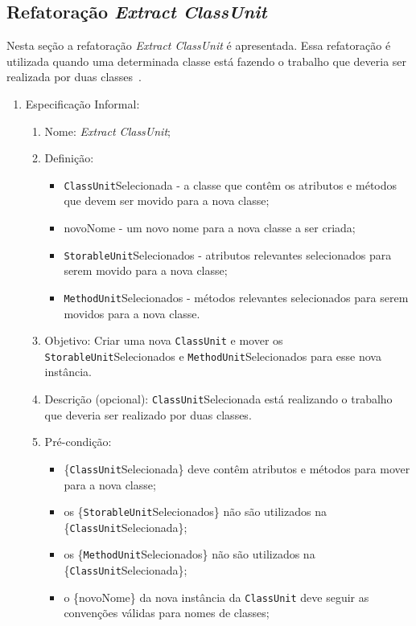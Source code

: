 	
	
\subsection{Refatoração \textit{Extract ClassUnit}}
Nesta seção a refatoração \textit{Extract ClassUnit} é apresentada. Essa refatoração é utilizada quando uma determinada classe está fazendo o trabalho que deveria ser realizada por duas classes~\cite{Fowler1999}. 

\begin{enumerate}
	\item Especificação Informal:
		\begin{enumerate}
			\item Nome: \textit{Extract ClassUnit};
			\item Definição:
			    \begin{itemize}
			        \item \texttt{ClassUnit}Selecionada - a classe que contêm os atributos e métodos que devem ser movido para a nova classe;
			        \item novoNome - um novo nome para a nova classe a ser criada;
			        \item \texttt{StorableUnit}Selecionados - atributos relevantes selecionados para serem movido para a nova classe;
			        \item \texttt{MethodUnit}Selecionados - métodos relevantes selecionados para serem movidos para a nova classe.
			    \end{itemize}
			\item Objetivo: Criar uma nova \texttt{ClassUnit} e mover os \texttt{StorableUnit}Selecionados e \texttt{MethodUnit}Selecionados para esse nova instância.
			\item Descrição (opcional): \texttt{ClassUnit}Selecionada está realizando o trabalho que deveria ser realizado por duas classes.
			\item Pré-condição:
			    \begin{itemize}
			        \item \{\texttt{ClassUnit}Selecionada\} deve contêm atributos e métodos para mover para a nova classe;
			        \item os \{\texttt{StorableUnit}Selecionados\} não são utilizados na \{\texttt{ClassUnit}Selecionada\};
			        \item os \{\texttt{MethodUnit}Selecionados\} não são utilizados na \{\texttt{ClassUnit}Selecionada\};
			        \item o \{novoNome\} da nova instância da \texttt{ClassUnit} deve seguir as convenções válidas para nomes de classes;

\end{itemize}
\end{enumerate}
\end{enumerate}
